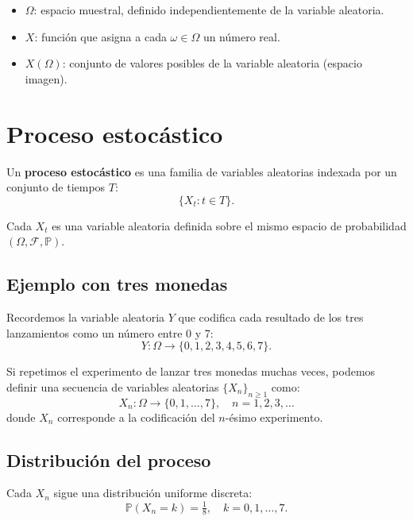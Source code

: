\documentclass[12pt]{article}
\begin{document}
\begin{itemize}
    \item $\Omega$: espacio muestral, definido independientemente de la variable aleatoria.
    \item $X$: función que asigna a cada $\omega \in \Omega$ un número real.
    \item $X(\Omega)$: conjunto de valores posibles de la variable aleatoria (espacio imagen).
\end{itemize}

\section{Proceso estocástico}

Un \textbf{proceso estocástico} es una familia de variables aleatorias indexada por un conjunto
de tiempos $T$:
\begin{equation*}
\{X_t : t \in T\}.
\end{equation*}

Cada $X_t$ es una variable aleatoria definida sobre el mismo espacio de probabilidad
$(\Omega,\mathcal{F},\mathbb{P})$.

\subsection{Ejemplo con tres monedas}

Recordemos la variable aleatoria $Y$ que codifica cada resultado de los tres lanzamientos
como un número entre 0 y 7:
\begin{equation*}
Y : \Omega \to \{0,1,2,3,4,5,6,7\}.
\end{equation*}

Si repetimos el experimento de lanzar tres monedas muchas veces, podemos definir
una secuencia de variables aleatorias $\{X_n\}_{n \geq 1}$ como:
\begin{equation*}
X_n : \Omega \to \{0,1,\dots,7\}, \quad n = 1,2,3,\dots
\end{equation*}
donde $X_n$ corresponde a la codificación del $n$-ésimo experimento.

\subsection{Distribución del proceso}

Cada $X_n$ sigue una distribución uniforme discreta:
\begin{equation*}
\mathbb{P}(X_n = k) = \tfrac{1}{8}, \quad k=0,1,\dots,7.
\end{equation*}
\end{document}
